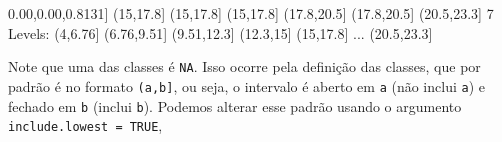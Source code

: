 \documentclass[
  10pt,
  a4paper]{book}
\newenvironment{Shaded}{\begin{snugshade}}{\end{snugshade}}
\newcommand{\DecValTok}[1]{\textcolor[rgb]{0.00,0.00,0.81}{#1}}
\newcommand{\FloatTok}[1]{\textcolor[rgb]{0.00,0.00,0.81}{#1}}
\newcommand{\FunctionTok}[1]{\textcolor[rgb]{0.00,0.00,0.00}{#1}}
\newcommand{\NormalTok}[1]{#1}
\newcommand{\SpecialCharTok}[1]{\textcolor[rgb]{0.00,0.00,0.00}{#1}}
\begin{document}
\begin{Shaded}
\begin{Highlighting}[]
\NormalTok{[}\DecValTok{31}\NormalTok{] (}\DecValTok{15}\NormalTok{,}\FloatTok{17.8}\NormalTok{]   (}\DecValTok{15}\NormalTok{,}\FloatTok{17.8}\NormalTok{]   (}\DecValTok{15}\NormalTok{,}\FloatTok{17.8}\NormalTok{]   (}\FloatTok{17.8}\NormalTok{,}\FloatTok{20.5}\NormalTok{] (}\FloatTok{17.8}\NormalTok{,}\FloatTok{20.5}\NormalTok{] (}\FloatTok{20.5}\NormalTok{,}\FloatTok{23.3}\NormalTok{]}
\DecValTok{7}\NormalTok{ Levels}\SpecialCharTok{:}\NormalTok{ (}\DecValTok{4}\NormalTok{,}\FloatTok{6.76}\NormalTok{] (}\FloatTok{6.76}\NormalTok{,}\FloatTok{9.51}\NormalTok{] (}\FloatTok{9.51}\NormalTok{,}\FloatTok{12.3}\NormalTok{] (}\FloatTok{12.3}\NormalTok{,}\DecValTok{15}\NormalTok{] (}\DecValTok{15}\NormalTok{,}\FloatTok{17.8}\NormalTok{] }\FunctionTok{...}\NormalTok{ (}\FloatTok{20.5}\NormalTok{,}\FloatTok{23.3}\NormalTok{]}
\end{Highlighting}
\end{Shaded}

Note que uma das classes é \texttt{NA}. Isso ocorre pela definição das classes,
que por padrão é no formato \texttt{(a,b{]}}, ou seja, o intervalo é aberto em
\texttt{a} (não inclui \texttt{a}) e fechado em \texttt{b} (inclui \texttt{b}). Podemos alterar esse
padrão usando o argumento \texttt{include.lowest\ =\ TRUE},
\end{document}
